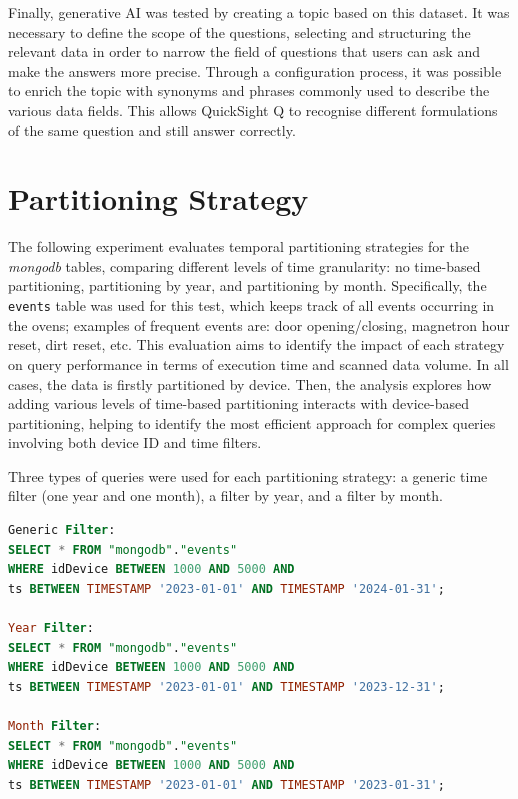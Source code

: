 Finally, generative AI was tested by creating a topic based on this dataset. It was necessary to define the scope of the questions, selecting and structuring the relevant data in order to narrow the field of questions that users can ask and make the answers more precise. Through a configuration process, it was possible to enrich the topic with synonyms and phrases commonly used to describe the various data fields. This allows QuickSight Q to recognise different formulations of the same question and still answer correctly.

\section{Partitioning Strategy}
\label{sec:partitioningstrategy}
The following experiment evaluates temporal partitioning strategies for the \textit{mongodb} tables, comparing different levels of time granularity: no time-based partitioning, partitioning by year, and partitioning by month. Specifically, the \texttt{events} table was used for this test, which keeps track of all events occurring in the ovens; examples of frequent events are: door opening/closing, magnetron hour reset, dirt reset, etc. This evaluation aims to identify the impact of each strategy on query performance in terms of execution time and scanned data volume. In all cases, the data is firstly partitioned by device. Then, the analysis explores how adding various levels of time-based partitioning interacts with device-based partitioning, helping to identify the most efficient approach for complex queries involving both device ID and time filters.

Three types of queries were used for each partitioning strategy: a generic time filter (one year and one month), a filter by year, and a filter by month.
\begin{lstlisting}[language=SQL, caption={SQL Queries used for Execution Time and Data Scanning Analysis}]
Generic Filter: 
SELECT * FROM "mongodb"."events" 
WHERE idDevice BETWEEN 1000 AND 5000 AND 
ts BETWEEN TIMESTAMP '2023-01-01' AND TIMESTAMP '2024-01-31';

Year Filter: 
SELECT * FROM "mongodb"."events" 
WHERE idDevice BETWEEN 1000 AND 5000 AND 
ts BETWEEN TIMESTAMP '2023-01-01' AND TIMESTAMP '2023-12-31';

Month Filter: 
SELECT * FROM "mongodb"."events" 
WHERE idDevice BETWEEN 1000 AND 5000 AND 
ts BETWEEN TIMESTAMP '2023-01-01' AND TIMESTAMP '2023-01-31';
\end{lstlisting}

